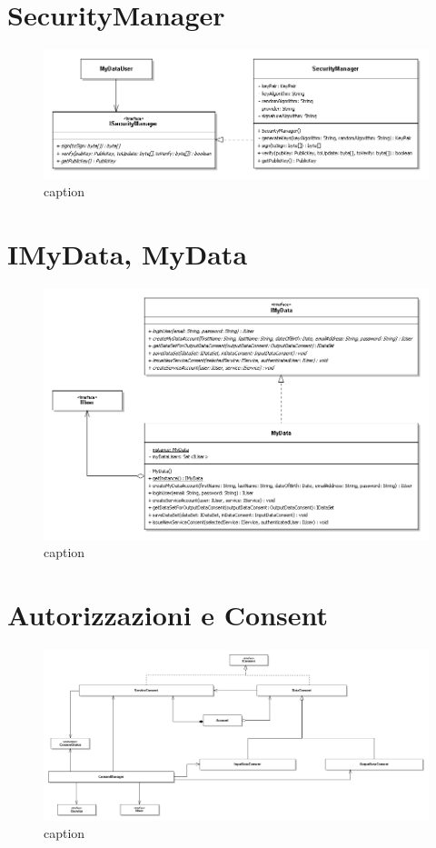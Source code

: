\section{SecurityManager}
\begin{figure} [h]
	\includegraphics[width=\linewidth]{pictures/Accounting-SecurityManager.png}
	\caption{caption}
	\label{fig:Accounting-SecurityManager}
\end{figure}
\cite{javasecurity} \cite{javacrypto}

\section{IMyData, MyData}
\begin{figure} [h]
	\includegraphics[width=\linewidth]{pictures/MyData.png}
	\caption{caption}
	\label{fig:Accounting-MyData}
\end{figure}

\section{Autorizzazioni e Consent}
\label{sec:P-AutorizzazioniEConsent}
\begin{figure} [h]
\includegraphics[width=\linewidth]{pictures/Auth-closed.png}
\caption{caption}
\label{fig:Auth-closed}
\end{figure}

